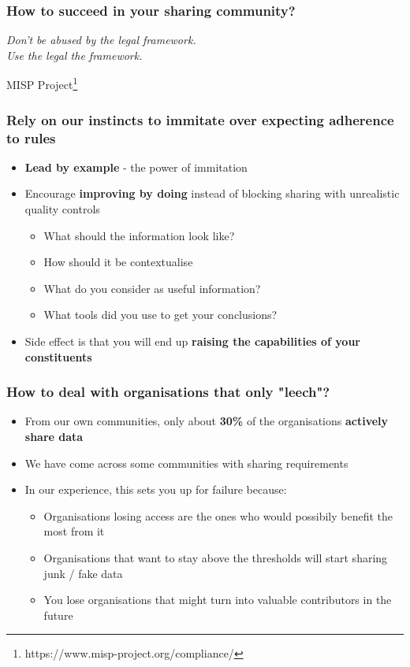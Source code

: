 \begin{frame}
\frametitle{How to succeed in your sharing community?}
        {\center \it \Huge Don't be abused by the legal framework.\\ Use the legal the framework.\\}
        \begin{flushright}
        MISP Project\footnote{https://www.misp-project.org/compliance/}
        \end{flushright}
\end{frame}

\begin{frame}
\frametitle{Rely on our instincts to immitate over expecting adherence to rules}
\begin{itemize}
    \item {\bf Lead by example} - the power of immitation
    \item Encourage {\bf improving by doing} instead of blocking sharing with unrealistic quality controls
	\begin{itemize}
		\item What should the information look like?
		\item How should it be contextualise
		\item What do you consider as useful information?
		\item What tools did you use to get your conclusions?
	\end{itemize}
\item Side effect is that you will end up {\bf raising the capabilities of your constituents}
\end{itemize}
\end{frame}

\begin{frame}
\frametitle{How to deal with organisations that only "leech"?}
\begin{itemize}
    \item From our own communities, only about {\bf 30\%} of the organisations {\bf actively share data}
	\item We have come across some communities with sharing requirements
	\item In our experience, this sets you up for failure because:
	\begin{itemize}
		\item Organisations losing access are the ones who would possibily benefit the most from it
		\item Organisations that want to stay above the thresholds will start sharing junk / fake data
		\item You lose organisations that might turn into valuable contributors in the future
	\end{itemize}
\end{itemize}
\end{frame}

